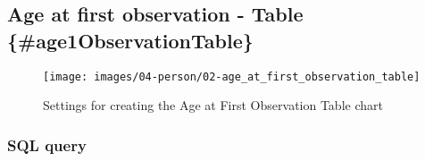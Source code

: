 \documentclass[
]{book}
\begin{document}
\hypertarget{age-at-first-observation---table-age1observationtable}{%
\subsection*{Age at first observation - Table \{\#age1ObservationTable\}}\label{age-at-first-observation---table-age1observationtable}}

\begin{figure}
\texttt{[image: images/04-person/02-age\_at\_first\_observation\_table]} \caption{Settings for creating the Age at First Observation Table chart}\label{fig:ageFirstObservationTable}
\end{figure}

\hypertarget{sql-query-15}{%
\subsubsection*{SQL query}\label{sql-query-15}}
\end{document}
